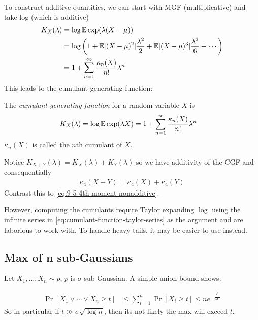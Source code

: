 To construct additive quantities, we can start with MGF (multiplicative)
and take log (which is additive)
\begin{align}
    K_X(\lambda)
    &= \log \mathbb{E} \exp(\lambda (X - \mu)) \\
    &= \log\left(
        1 + \mathbb{E}[(X - \mu)^2] \frac{\lambda^2}{2} + \mathbb{E}[(X - \mu)^3] \frac{\lambda^3}{6} + \cdots
    \right) \label{eq:cumulant-function-taylor-series} \\
    &= 1 + \sum_{n=1}^\infty \frac{\kappa_n(X)}{n!}\lambda^n
\end{align}
This leads to the cumulant generating function:
\begin{definition}[Cumulants]
    The \emph{cumulant generating function} for a random variable $X$ is
    \begin{align}
        K_X(\lambda) &= \log \mathbb{E} \exp(\lambda X) = 1 + \sum_{n=1}^\infty \frac{\kappa_n(X)}{n!}\lambda^n
    \end{align}
    $\kappa_n(X)$ is called the $n$th cumulant of $X$.
\end{definition}
Notice $K_{X + Y}(\lambda) = K_X(\lambda) + K_Y(\lambda)$ so we have additivity of the CGF and consequentially
\begin{align}
    \kappa_4(X + Y) = \kappa_4(X) + \kappa_4(Y)
\end{align}
Contrast this to \cref{eq:9-5-4th-moment-nonadditive}.

However, computing the cumulants require Taylor expanding $\log$ using the infinite
series in \cref{eq:cumulant-function-taylor-series} as the argument and are laborious to work with.
To handle heavy tails, it may be easier to use  instead.

\subsection{Max of n sub-Gaussians}

Let $X_1, \ldots, X_n \sim p$, $p$ is $\sigma$-sub-Gaussian. A simple union bound shows:
\begin{theorem}\label{thm:max-sub-gaussian}
    \begin{align}
        \Pr[X_1 \lor \cdots \lor X_n \geq t]
        &\leq \sum_{i=1}^n \Pr[X_i \geq t]
        \leq n e^{-\frac{t^2}{2 \sigma^2}}
    \end{align}
    So in particular if $t \gg \sigma \sqrt{\log n}$, then its not likely the max will exceed $t$.
\end{theorem}
